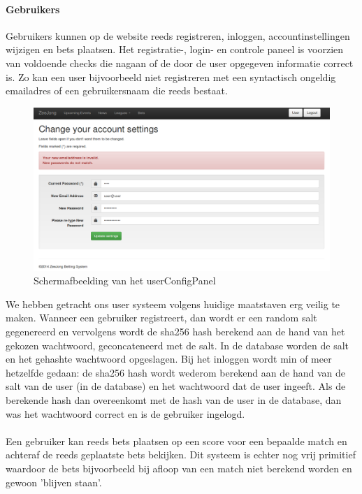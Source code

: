 \documentclass[11pt]{article}
\begin{document}
\paragraph{Gebruikers}
Gebruikers kunnen op de website reeds registreren, inloggen, accountinstellingen wijzigen en bets plaatsen.
Het registratie-, login- en controle paneel is voorzien van voldoende checks die nagaan of de door de user opgegeven informatie correct is.  Zo kan een user bijvoorbeeld niet registreren met een syntactisch ongeldig emailadres of een gebruikersnaam die reeds bestaat.
\begin{figure}[h!]
	\begin{center}
	\includegraphics[scale=0.30]{changesettings.png}

	\caption{Schermafbeelding van het userConfigPanel}
	\label{fig:configPanel}
	\end{center}
\end{figure}
We hebben getracht ons user systeem volgens huidige maatstaven erg veilig te maken.
Wanneer een gebruiker registreert, dan wordt er een random salt gegenereerd en vervolgens wordt de sha256 hash berekend aan de hand van het gekozen wachtwoord, geconcateneerd met de salt.
In de database worden de salt en het gehashte wachtwoord opgeslagen.
Bij het inloggen wordt min of meer hetzelfde gedaan: de sha256 hash wordt wederom berekend aan de hand van de salt van de user (in de database) en het wachtwoord dat de user ingeeft.
Als de berekende hash dan overeenkomt met de hash van de user in de database, dan was het wachtwoord correct en is de gebruiker ingelogd.
\\\\
Een gebruiker kan reeds bets plaatsen op een score voor een bepaalde match en achteraf de reeds geplaatste bets bekijken.  Dit systeem is echter nog vrij primitief waardoor de bets bijvoorbeeld bij afloop van een match niet berekend worden en gewoon 'blijven staan'.
\end{document}
